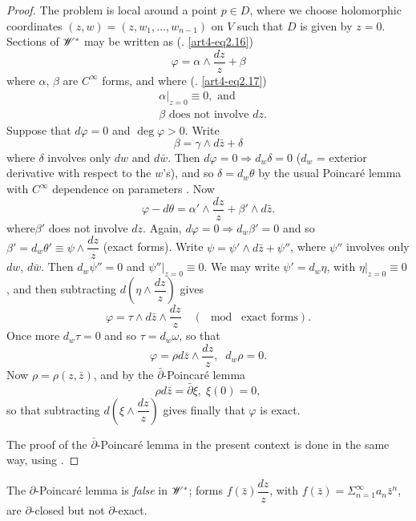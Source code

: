 \begin{proof}
The problem is local around a point $p \in D$, where we choose holomorphic coordinates $(z, w ) = (z, w_1, \ldots , w_{n-1})$ on $V$ such that $D$ is given by $z=0$. Sections of $\mathscr{W}^\ast$ may be written as  (\cf. \eqref{art4-eq2.16})
$$
\varphi = \alpha \wedge \frac{dz}{z} + \beta
$$
where $\alpha$, $\beta$ are $C^\infty$ forms, and where (\cf. \eqref{art4-eq2.17})
\begin{align*}
& \alpha|_{z=0} \equiv 0, \text{ and }\\
& \beta \text{ does not involve } dz.
\end{align*}
Suppose that $d\varphi = 0$ and $\deg \varphi > 0$. Write 
$$
\beta = \gamma \wedge d \bar{z}  + \delta 
$$
where $\delta$ involves only $dw$ and $d \bar{w}$. Then $d\varphi = 0 \Rightarrow d_w \delta = 0$ ($d_w$ = exterior derivative with respect to the $w$'s), and so $\delta = d_w \theta$ by the usual Poincar\'e lemma with $C^\infty$ dependence on parameters \cite{art4-key16}. Now
$$
\varphi - d\theta = \alpha' \wedge \frac{dz}{z} + \beta' \wedge d \bar{z}.
$$
where\pageoriginale $\beta'$ does not involve $dz$. Again, $d\varphi=0 \Rightarrow d_w \beta' =0$ and so $\beta' = d_w \theta' \equiv \psi \wedge \dfrac{dz}{z}$ (\mod exact forms). Write $\psi = \psi' \wedge d \bar{z} + \psi''$, where $\psi''$ involves only $dw$, $d\bar{w}$. Then $d_w \psi'' =0$ and $\psi'' |_{z=0} \equiv 0$. We may write $\psi' = d_w \eta$, with $\eta |_{z=0} \equiv 0$ \cite{art4-key16}, and then subtracting $d \left(\eta \wedge \dfrac{dz}{z} \right)$ gives
$$
\varphi = \tau \wedge d\bar{z} \wedge \frac{dz}{z} \quad  (\mod \text{ exact forms}).
$$
Once more $d_w \tau = 0$ and so $\tau = d_w \omega$, so that
$$
\varphi = \rho d \bar{z} \wedge \frac{dz}{z}, \;\; d_w \rho =0.
$$
Now $\rho = \rho (z, \bar{z})$, and by the $\bar{\partial}$-Poincar\'e lemma \cite{art4-key39}
$$
\rho d \bar{z} = \bar{\partial} \xi, \; \xi (0) = 0,
$$
so that subtracting $d \left(\xi \wedge \dfrac{dz}{z} \right)$ gives finally that $\varphi$ is exact.

The proof of the $\bar{\partial}$-Poincar\'e lemma in the present context is done in the same way, using \cite{art4-key39}.
\end{proof}

\begin{remark*}
The $\partial$-Poincar\'e lemma is \textit{false} in $\mathscr{W}^\ast$; forms $f(\bar{z}) \dfrac{dz}{z}$, with $f (\bar{z})= \Sigma^{\infty}_{n=1} a_n \bar{z}^n$, are $\partial$-closed but not $\partial$-exact.
\end{remark*}

